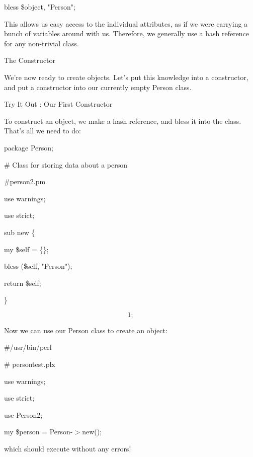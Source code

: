 \documentclass[a4paper,11pt]{book}
\begin{document}
\noindent bless \$object, "Person";

\noindent 

\noindent This allows us easy access to the individual attributes, as if we were carrying a bunch of variables around with us. Therefore, we generally use a hash reference for any non-trivial class.

\noindent 

\noindent The Constructor

\noindent 

\noindent We're now ready to create objects. Let's put this knowledge into a constructor, and put a constructor into our currently empty Person class.

\noindent 

\noindent Try It Out : Our First Constructor

\noindent To construct an object, we make a hash reference, and bless it into the class. That's all we need to do:

\noindent 

\noindent package Person;

\noindent \# Class for storing data about a person

\noindent \#person2.pm

\noindent use warnings;

\noindent use strict;

\noindent 

\noindent sub new \{

\noindent my \$self = \{\};

\noindent bless (\$self, "Person");

\noindent return \$self;

\noindent \}

\noindent 

\[1;\] 


\noindent Now we can use our Person class to create an object:

\noindent 

\noindent \#/usr/bin/perl

\noindent \# persontest.plx

\noindent use warnings;

\noindent use strict;

\noindent use Person2;

\noindent 

\noindent my \$person = Person-$>$new();

\noindent 

\noindent which should execute without any errors!
\end{document}
